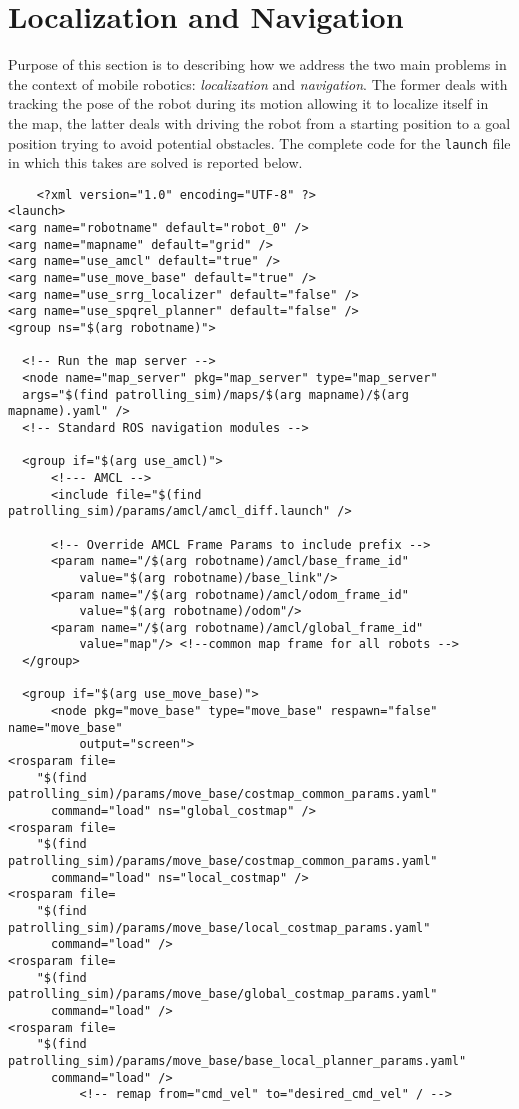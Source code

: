 \section{Localization and Navigation}
Purpose of this section is to describing how we address the two main problems in
the context of mobile robotics: \textit{localization} and \textit{navigation}.
The former deals with tracking the pose of the robot during its motion allowing
it to localize itself in the map, the latter deals with driving the robot from a 
starting position to a goal position trying to avoid potential obstacles.
The complete code for the \texttt{launch} file in which this takes are solved is reported
below.
\begin{lstlisting}
    <?xml version="1.0" encoding="UTF-8" ?>
<launch>
<arg name="robotname" default="robot_0" />
<arg name="mapname" default="grid" />
<arg name="use_amcl" default="true" />
<arg name="use_move_base" default="true" />
<arg name="use_srrg_localizer" default="false" />
<arg name="use_spqrel_planner" default="false" />
<group ns="$(arg robotname)">    
  
  <!-- Run the map server -->
  <node name="map_server" pkg="map_server" type="map_server"
  args="$(find patrolling_sim)/maps/$(arg mapname)/$(arg mapname).yaml" />
  <!-- Standard ROS navigation modules -->
  
  <group if="$(arg use_amcl)">
      <!--- AMCL -->
      <include file="$(find patrolling_sim)/params/amcl/amcl_diff.launch" />       
          
      <!-- Override AMCL Frame Params to include prefix -->
      <param name="/$(arg robotname)/amcl/base_frame_id" 
          value="$(arg robotname)/base_link"/>
      <param name="/$(arg robotname)/amcl/odom_frame_id" 
          value="$(arg robotname)/odom"/>
      <param name="/$(arg robotname)/amcl/global_frame_id" 
          value="map"/> <!--common map frame for all robots -->
  </group>
      
  <group if="$(arg use_move_base)">
      <node pkg="move_base" type="move_base" respawn="false" name="move_base"
          output="screen">
<rosparam file=
    "$(find patrolling_sim)/params/move_base/costmap_common_params.yaml"
      command="load" ns="global_costmap" />
<rosparam file=
    "$(find patrolling_sim)/params/move_base/costmap_common_params.yaml" 
      command="load" ns="local_costmap" />
<rosparam file=
    "$(find patrolling_sim)/params/move_base/local_costmap_params.yaml"
      command="load" />
<rosparam file=
    "$(find patrolling_sim)/params/move_base/global_costmap_params.yaml"
      command="load" />
<rosparam file=
    "$(find patrolling_sim)/params/move_base/base_local_planner_params.yaml"
      command="load" />
          <!-- remap from="cmd_vel" to="desired_cmd_vel" / -->
  

\end{lstlisting}
